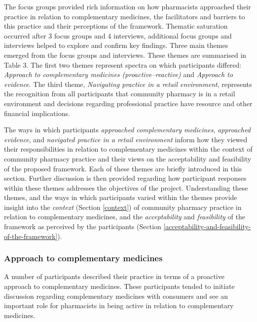 \documentclass[11pt,a4paper]{article}
\begin{document}
The focus groups provided rich information on how pharmacists approached
their practice in relation to complementary medicines, the facilitators
and barriers to this practice and their perceptions of the framework.
Thematic saturation occurred after 3 focus groups and 4 interviews,
additional focus groups and interviews helped to explore and confirm key
findings. Three main themes emerged from the focus groups and
interviews. These themes are summarised in Table 3. The first two themes
represent spectra on which participants differed: \emph{Approach to
complementary medicines (proactive--reactive)} and \emph{Approach to
evidence}. The third theme, \emph{Navigating practice in a retail
environment}, represents the recognition from all participants that
community pharmacy is in a retail environment and decisions regarding
professional practice have resource and other financial implications.



The ways in which participants \emph{approached complementary
medicines}, \emph{approached evidence}, and \emph{navigated practice in
a retail environment} inform how they viewed their responsibilities in
relation to complementary medicines within the context of community
pharmacy practice and their views on the acceptability and feasibility
of the proposed framework. Each of these themes are briefly introduced
in this section. Further discussion is then provided regarding how
participant responses within these themes addresses the objectives of
the project. Understanding these themes, and the ways in which
participants varied within the themes provide insight into the
\emph{context} (Section \ref{context}) of community pharmacy practice in
relation to complementary medicines, and the \emph{acceptability} and
\emph{feasibility} of the framework as perceived by the participants
(Section \ref{acceptability-and-feasibility-of-the-framework}).

\subsubsection{Approach to complementary
medicines}\label{approach-to-complementary-medicines}

A number of participants described their practice in terms of a
proactive approach to complementary medicines. These participants tended
to initiate discussion regarding complementary medicines with consumers
and see an important role for pharmacists in being active in relation to
complementary medicines.
\end{document}
